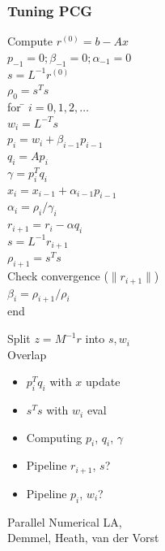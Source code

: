 \documentclass{beamer}
\begin{document}
\begin{frame}[fragile]
  \frametitle{Tuning PCG}

\begin{minipage}{0.5\textwidth}
\begin{tabbing}
Compute $r^{(0)} = b - Ax$ \\
$p_{-1} = 0; \beta_{-1} = 0; \alpha_{-1} = 0$ \\
$s = L^{-1} r^{(0)}$ \\
$\rho_0 = s^T s$ \\
for \= $i = 0, 1, 2, \ldots$ \\
\> $w_i = L^{-T} s$ \\
\> $p_i = w_i + \beta_{i-1} p_{i-1}$ \\
\> $q_i = A p_i$ \\
\> $\gamma = p_i^T q_i$ \\
\> $x_i = x_{i-1} + \alpha_{i-1} p_{i-1}$ \\
\> $\alpha_{i} = \rho_{i}/\gamma_{i}$ \\
\> $r_{i+1} = r_i - \alpha q_{i}$ \\
\> $s = L^{-1} r_{i+1}$ \\
\> $\rho_{i+1} = s^T s$ \\
\> Check convergence ($\|r_{i+1}\|$) \\
\> $\beta_{i} = \rho_{i+1}/\rho_i$ \\
end
\end{tabbing}
\end{minipage}
\begin{minipage}{0.5\textwidth}
  Split $z = M^{-1} r$ into $s, w_i$ \\
  Overlap
  \begin{itemize}
  \item $p_i^T q_i$ with $x$ update
  \item $s^T s$ with $w_i$ eval
  \item Computing $p_i$, $q_i$, $\gamma$
  \item Pipeline $r_{i+1}$, $s$?
  \item Pipeline $p_i$, $w_i$?
  \end{itemize}

  \vspace{5mm}
  Parallel Numerical LA, \\
  Demmel, Heath, van der Vorst
\end{minipage}

\end{frame}
\end{document}
